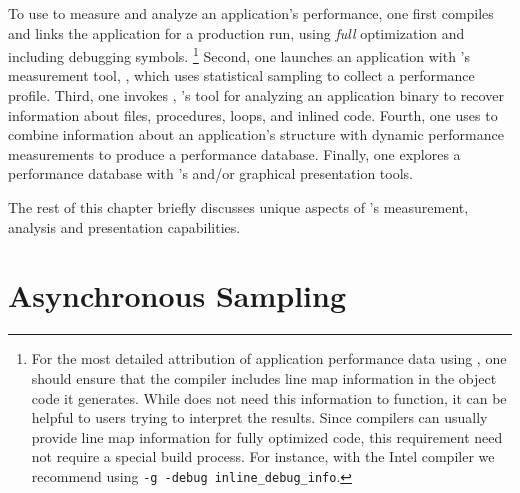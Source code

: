\documentclass[11pt,letterpaper]{report}
\begin{document}
To use \HPCToolkit{} to measure and analyze an application's performance, one first compiles and links the application for a production run, using \emph{full} optimization and including debugging symbols.%
\footnote{%
For the most detailed attribution of application performance data using \HPCToolkit{}, one should ensure that the compiler includes line map information in the object code it generates. While \HPCToolkit{} does not need this information to function, it can be helpful to users trying to interpret the results. Since compilers can usually provide line map information for fully optimized code, this requirement need not require a special build process. For instance, with the Intel compiler we recommend using \texttt{-g -debug inline\_debug\_info}.}
Second, one launches an application with \HPCToolkit{}'s measurement tool, \hpcrun{}, which uses statistical sampling to collect a performance profile.
Third, one invokes \hpcstruct{}, \HPCToolkit{}'s tool for analyzing an application binary to recover information about files, procedures, loops, and inlined code.
Fourth, one uses \hpcprof{} to combine information about an application's structure with dynamic performance measurements to produce a performance database.
Finally, one explores a performance database with \HPCToolkit{}'s \hpcviewer{} and/or \hpctraceviewer{} graphical presentation tools.

The rest of this chapter briefly discusses unique aspects of \HPCToolkit{}'s measurement, analysis and presentation capabilities.


\section{Asynchronous Sampling}
\end{document}
